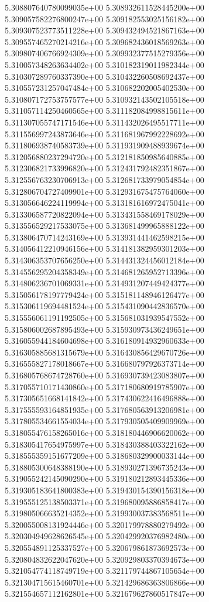 5.308807640780099035e+00
5.308932611528445200e+00
5.309057582276800247e+00
5.309182553025156182e+00
5.309307523773511228e+00
5.309432494521867163e+00
5.309557465270214216e+00
5.309682436018569263e+00
5.309807406766924309e+00
5.309932377515279356e+00
5.310057348263634402e+00
5.310182319011982344e+00
5.310307289760337390e+00
5.310432260508692437e+00
5.310557231257047484e+00
5.310682202005402530e+00
5.310807172753757577e+00
5.310932143502105518e+00
5.311057114250460565e+00
5.311182084998815611e+00
5.311307055747171546e+00
5.311432026495517711e+00
5.311556997243873646e+00
5.311681967992228692e+00
5.311806938740583739e+00
5.311931909488939674e+00
5.312056880237294720e+00
5.312181850985640885e+00
5.312306821733996820e+00
5.312431792482351867e+00
5.312556763230706913e+00
5.312681733979054854e+00
5.312806704727409901e+00
5.312931675475764060e+00
5.313056646224119994e+00
5.313181616972475041e+00
5.313306587720822094e+00
5.313431558469178029e+00
5.313556529217533075e+00
5.313681499965888122e+00
5.313806470714243169e+00
5.313931441462598215e+00
5.314056412210946156e+00
5.314181382959301203e+00
5.314306353707656250e+00
5.314431324456012184e+00
5.314556295204358349e+00
5.314681265952713396e+00
5.314806236701069331e+00
5.314931207449424377e+00
5.315056178197779424e+00
5.315181148946126477e+00
5.315306119694481524e+00
5.315431090442836570e+00
5.315556061191192505e+00
5.315681031939547552e+00
5.315806002687895493e+00
5.315930973436249651e+00
5.316055944184604698e+00
5.316180914932960633e+00
5.316305885681315679e+00
5.316430856429670726e+00
5.316555827178018667e+00
5.316680797926373714e+00
5.316805768674728760e+00
5.316930739423083807e+00
5.317055710171430860e+00
5.317180680919785907e+00
5.317305651668141842e+00
5.317430622416496888e+00
5.317555593164851935e+00
5.317680563913206981e+00
5.317805534661554034e+00
5.317930505409909969e+00
5.318055476158265016e+00
5.318180446906620062e+00
5.318305417654975997e+00
5.318430388403322162e+00
5.318555359151677209e+00
5.318680329900033144e+00
5.318805300648388190e+00
5.318930271396735243e+00
5.319055242145090290e+00
5.319180212893445336e+00
5.319305183641800383e+00
5.319430154390156318e+00
5.319555125138503371e+00
5.319680095886858417e+00
5.319805066635214352e+00
5.319930037383568511e+00
5.320055008131924446e+00
5.320179978880279492e+00
5.320304949628626545e+00
5.320429920376982480e+00
5.320554891125337527e+00
5.320679861873692573e+00
5.320804832622047620e+00
5.320929803370394673e+00
5.321054774118749719e+00
5.321179744867105654e+00
5.321304715615460701e+00
5.321429686363806866e+00
5.321554657112162801e+00
5.321679627860517847e+00
